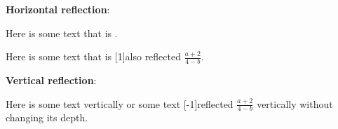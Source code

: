\documentclass{article}
\begin{document}
\textbf{Horizontal reflection}:
\par
Here is some text that is .
\par
Here is some text that is \scalebox{-1}[1]{also reflected $\frac{a+2}{4-b}$}.
\par \bigskip
\textbf{Vertical reflection}:
\par
Here is some text  vertically
or some text \scalebox{1}[-1]{reflected $\frac{a+2}{4-b}$} vertically without changing its depth.
\end{document}
